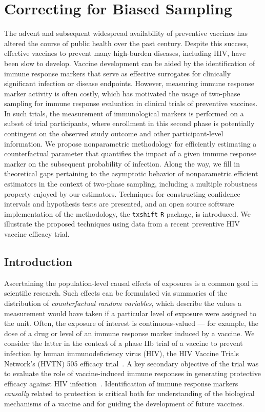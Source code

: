 \chapter{Correcting for Biased Sampling}\label{two}

The advent and subsequent widespread availability of preventive vaccines has
altered the course of public health over the past century. Despite this success,
effective vaccines to prevent many high-burden diseases, including HIV, have
been slow to develop. Vaccine development can be aided by the identification of
immune response markers that serve as effective surrogates for clinically
significant infection or disease endpoints. However, measuring immune response
marker activity is often costly, which has motivated the usage of two-phase
sampling for immune response evaluation in clinical trials of preventive
vaccines. In such trials, the measurement of immunological markers is performed
on a subset of trial participants, where enrollment in this second phase is
potentially contingent on the observed study outcome and other participant-level
information. We propose nonparametric methodology for efficiently estimating
a counterfactual parameter that quantifies the impact of a given immune response
marker on the subsequent probability of infection. Along the way, we fill in
theoretical gaps pertaining to the asymptotic behavior of nonparametric
efficient estimators in the context of two-phase sampling, including a multiple
robustness property enjoyed by our estimators. Techniques for constructing
confidence intervals and hypothesis tests are presented, and an open source
software implementation of the methodology, the \texttt{txshift} \texttt{R}
package, is introduced. We illustrate the proposed techniques using data from
a recent preventive HIV vaccine efficacy trial.

\section{Introduction}\label{two_intro}

Ascertaining the population-level causal effects of exposures is a common goal
in scientific research. Such effects can be formulated via summaries of the
distribution of \emph{counterfactual random variables}, which describe the
values a measurement would have taken if a particular level of exposure were
assigned to the unit. Often, the exposure of interest is continuous-valued ---
for example, the dose of a drug or level of an immune response marker induced by
a vaccine. We consider the latter in the context of a phase IIb trial of
a vaccine to prevent infection by human immunodeficiency virus (HIV), the HIV
Vaccine Trials Network's (HVTN) 505 efficacy trial~\citep{hammer2013efficacy}.
A key secondary objective of the trial was to evaluate the role of
vaccine-induced immune responses in generating protective efficacy against HIV
infection~\citep{janes2017higher}. Identification of immune response markers
\textit{causally} related to protection is critical both for understanding of
the biological mechanisms of a vaccine and for guiding the development of future
vaccines.

